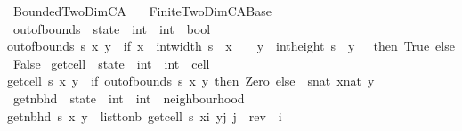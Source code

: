 %
\begin{isabellebody}%
%
%
\isadelimdocument
%
\endisadelimdocument
%
\isatagdocument
%
\isamarkuptrue%
%
\endisatagdocument
{\isafolddocument}%
%
\isadelimdocument
%
\endisadelimdocument
%
\isadelimtheory
%
\endisadelimtheory
%
\isatagtheory
{}\isamarkupfalse%
\ Bounded{\isacharunderscore}TwoDim{\isacharunderscore}CA\isanewline
\ \ \ Finite{\isacharunderscore}TwoDim{\isacharunderscore}CA{\isacharunderscore}Base\isanewline
{}%
\endisatagtheory
{\isafoldtheory}%
%
\isadelimtheory
\isanewline
%
\endisadelimtheory
\isanewline
{}\isamarkupfalse%
\ out{\isacharunderscore}of{\isacharunderscore}bounds\ {\isacharcolon}{\isacharcolon}\ {\isachardoublequoteopen}state\ {\isasymRightarrow}\ int\ {\isasymRightarrow}\ int\ {\isasymRightarrow}\ bool{\isachardoublequoteclose}\ \isanewline
{\isachardoublequoteopen}out{\isacharunderscore}of{\isacharunderscore}bounds\ s\ x\ y\ {\isacharequal}\ {\isacharparenleft}if\ x\ {\isasymge}\ int{\isacharunderscore}width\ s\ {\isasymor}\ x\ {\isacharless}\ {}\ {\isasymor}\ y\ {\isasymge}\ int{\isacharunderscore}height\ s\ {\isasymor}\ y\ {\isacharless}\ {}\ then\ True\ else\ False{\isacharparenright}{\isachardoublequoteclose}\isanewline
\isanewline
{}\isamarkupfalse%
\ get{\isacharunderscore}cell\ {\isacharcolon}{\isacharcolon}\ {\isachardoublequoteopen}state\ {\isasymRightarrow}\ int\ {\isasymRightarrow}\ int\ {\isasymRightarrow}\ cell{\isachardoublequoteclose}\ \isanewline
{\isachardoublequoteopen}get{\isacharunderscore}cell\ s\ x\ y\ {\isacharequal}\ {\isacharparenleft}if\ out{\isacharunderscore}of{\isacharunderscore}bounds\ s\ x\ y\ then\ Zero\ else\ \ s{\isacharbang}{\isacharparenleft}nat\ x{\isacharparenright}{\isacharbang}{\isacharparenleft}nat\ y{\isacharparenright}{\isacharparenright}{\isachardoublequoteclose}\isanewline
\isanewline
{}\isamarkupfalse%
\ get{\isacharunderscore}nbhd\ {\isacharcolon}{\isacharcolon}\ {\isachardoublequoteopen}state\ {\isasymRightarrow}\ int\ {\isasymRightarrow}\ int\ {\isasymRightarrow}\ neighbourhood{\isachardoublequoteclose}\ \isanewline
{\isachardoublequoteopen}get{\isacharunderscore}nbhd\ s\ x\ y\ {\isacharequal}\ list{\isacharunderscore}to{\isacharunderscore}nb\ {\isacharbrackleft}get{\isacharunderscore}cell\ s\ {\isacharparenleft}x{\isacharplus}i{\isacharparenright}\ {\isacharparenleft}y{\isacharplus}j{\isacharparenright}{\isachardot}\ j\ {\isasymleftarrow}\ rev\ {\isacharbrackleft}{\isacharminus}{}{\isachardot}{\isachardot}{}{\isacharbrackright}{\isacharcomma}\ i\ {\isasymleftarrow}\ {\isacharbrackleft}{\isacharminus}{}{\isachardot}{\isachardot}{}{\isacharbrackright}{\isacharbrackright}{\isachardoublequoteclose}\isanewline

\end{isabellebody}
